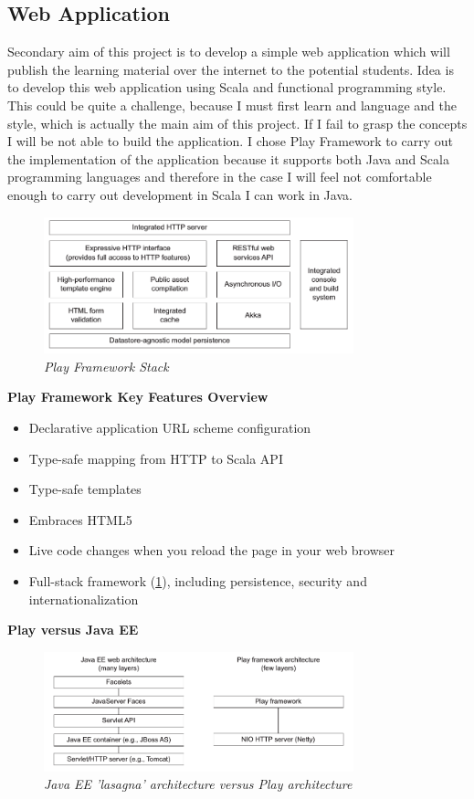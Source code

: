 \documentclass[12pt,twoside,a4paper]{report}
\begin{document}
\subsection{Web Application}\label{3.2.2}
Secondary aim of this project is to develop a simple web application which will publish the learning material over the internet to the potential students. Idea is to develop this web application using Scala and functional programming style. This could be quite a challenge, because I must first learn and language and the style, which is actually the main aim of this project. If I fail to grasp the concepts I will be not able to build the application. I chose Play Framework to carry out the implementation of the application because it supports both Java and Scala programming languages and therefore in the case I will feel not comfortable enough to carry out development in Scala I can work in Java.
\begin{figure}[!ht]
	\centering
		\includegraphics[width=0.8\textwidth, totalheight=6cm]{play_stack}
	\caption{\textit{Play Framework Stack}}
	\label{f3.1}
\end{figure}
\textbf{Play Framework Key Features Overview\cite{11}}
\begin{itemize}\itemsep1pt \parskip0pt 
\item Declarative application URL scheme configuration
\item Type-safe mapping from HTTP to Scala API
\item Type-safe templates
\item Embraces HTML5
\item Live code changes when you reload the page in your web browser
\item Full-stack framework (\cref{f3.1}), including persistence, security and internationalization
\end{itemize}
\textbf{Play versus Java EE}
\begin{figure}[!ht]
	\centering
		\includegraphics[width=0.8\textwidth, totalheight=6cm]{play_vs_java_ee}
	\caption{\textit{Java EE 'lasagna' architecture versus Play architecture}}
	\label{f3.2}
\end{figure}
\end{document}
